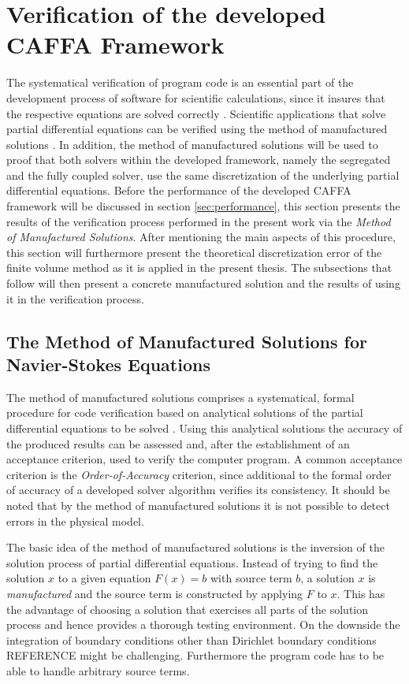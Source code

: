 \section{Verification of the developed CAFFA Framework}

The systematical verification of program code is an essential part of the development process of software for scientific calculations, since it insures that the respective equations are solved correctly \cite{oberkampf02}. Scientific applications that solve partial differential equations can be verified using the method of manufactured solutions \cite{salari00}. In addition, the method of manufactured solutions will be used to proof that both solvers within the developed framework, namely the segregated and the fully coupled solver, use the same discretization of the underlying partial differential equations. Before the performance of the developed CAFFA framework will be discussed in section \ref{sec:performance}, this section presents the results of the verification process performed in the present work via the \emph{Method of Manufactured Solutions}. After mentioning the main aspects of this procedure, this section will furthermore present the theoretical discretization error of the finite volume method as it is applied in the present thesis. The subsections that follow will then present a concrete manufactured solution and the results of using it in the verification process.

\subsection{The Method of Manufactured Solutions for Navier-Stokes Equations}

The method of manufactured solutions comprises a systematical, formal procedure for code verification based on analytical solutions of the partial differential equations to be solved \cite{salari00}. Using this analytical solutions the accuracy of the produced results can be assessed and, after the establishment of an acceptance criterion, used to verify the computer program. A common acceptance criterion is the \emph{Order-of-Accuracy} criterion, since additional to the formal order of accuracy of a developed solver algorithm verifies its consistency. It should be noted that by the method of manufactured solutions it is not possible to detect errors in the physical model.

The basic idea of the method of manufactured solutions is the inversion of the solution process of partial differential equations. Instead of trying to find the solution \(x\) to a given equation \(F(x) = b\) with source term \(b\), a solution \(x\) is \emph{manufactured} and the source term is constructed by applying \(F\) to \(x\). This has the advantage of choosing a solution that exercises all parts of the solution process and hence provides a thorough testing environment. On the downside the integration of boundary conditions other than Dirichlet boundary conditions REFERENCE might be challenging. Furthermore the program code has to be able to handle arbitrary source terms. 

